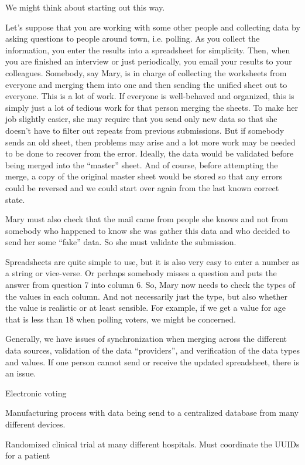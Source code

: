 We might think about starting out this way.

Let's suppose that you are working with some other people and
collecting data by asking questions to people around town,
i.e. polling.  As you collect the information, you enter the results
into a spreadsheet for simplicity.  Then, when you are finished an
interview or just periodically, you email your results to your
colleagues.  Somebody, say Mary, is in charge of collecting the
worksheets from everyone and merging them into one and then sending
the unified sheet out to everyone.  This is a lot of work.  If
everyone is well-behaved and organized, this is simply just a lot of
tedious work for that person merging the sheets.  To make her job
slightly easier, she may require that you send only new data so that
she doesn't have to filter out repeats from previous submissions.  But
if somebody sends an old sheet, then problems may arise and a lot more
work may be needed to be done to recover from the error.  Ideally, the
data would be validated before being merged into the ``master''
sheet. And of course, before attempting the merge, a copy of the
original master sheet would be stored so that any errors could be
reversed and we could start over again from the last known correct
state.

Mary must also check that the mail came from people she knows and
not from somebody who happened to know she was gather this data
and who decided to send her some ``fake'' data.
So she must validate the submission.

Spreadsheets are quite simple to use, but it is also very easy to
enter a number as a string or vice-verse. Or perhaps somebody misses a
question and puts the answer from question 7 into column 6. So, Mary
now needs to check the types of the values in each column.  And not
necessarily just the type, but also whether the value is realistic or
at least sensible.  For example, if we get a value for age that is
less than $18$ when polling voters, we might be concerned.



Generally, we have issues of synchronization when merging across the
different data sources, validation of the data ``providers'', and
verification of the data types and values.
If one person cannot send or receive the updated spreadsheet, there is
an issue. 

Electronic voting

Manufacturing process with data being send to a centralized database
from many different devices.

Randomized clinical trial at many different hospitals.
Must coordinate the UUIDs for a patient




